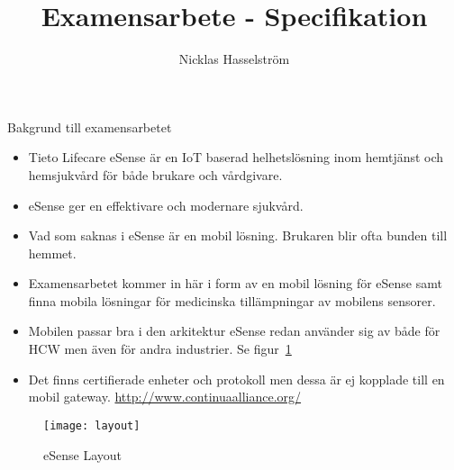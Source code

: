 \documentclass[a4paper]{article}
\title{\Huge Examensarbete - Specifikation}
\author{Nicklas Hasselström}
\date{}
\begin{document}
\maketitle
Bakgrund till examensarbetet
\begin{itemize}
	\item Tieto Lifecare eSense är en IoT baserad helhetslösning inom hemtjänst och hemsjukvård för både brukare och vårdgivare.
  	\item eSense ger en effektivare och modernare sjukvård.
  	\item Vad som saknas i eSense är en mobil lösning. Brukaren blir ofta bunden till hemmet.
  	\item Examensarbetet kommer in här i form av en mobil lösning för eSense samt finna mobila lösningar för medicinska tillämpningar av mobilens sensorer.
  	\item Mobilen passar bra i den arkitektur eSense redan använder sig av både för HCW men även för andra industrier. Se figur~\ref{fig:eSenseLayout}
  	\item Det finns certifierade enheter och protokoll men dessa är ej kopplade till en mobil gateway. \url{http://www.continuaalliance.org/}
\end{itemize}

\begin{figure}[h]
	\centering
		\texttt{[image: layout]}
	\label{fig:eSenseLayout}
	\caption{eSense Layout}
\end{figure}
\newpage
\end{document}
